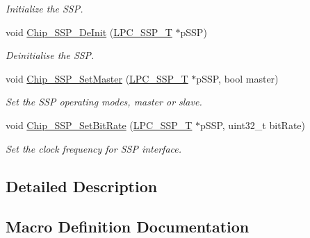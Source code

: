 \begin{DoxyCompactItemize}
\begin{DoxyCompactList}\small\item\em Initialize the S\+SP. \end{DoxyCompactList}\item 
void \hyperlink{group___s_s_p__18_x_x__43_x_x_ga48f87506f2fddc1043606eae292b6f16}{Chip\+\_\+\+S\+S\+P\+\_\+\+De\+Init} (\hyperlink{struct_l_p_c___s_s_p___t}{L\+P\+C\+\_\+\+S\+S\+P\+\_\+T} $\ast$p\+S\+SP)
\begin{DoxyCompactList}\small\item\em Deinitialise the S\+SP. \end{DoxyCompactList}\item 
void \hyperlink{group___s_s_p__18_x_x__43_x_x_ga60e601329b0aa6afe5f355dc6e8f84bd}{Chip\+\_\+\+S\+S\+P\+\_\+\+Set\+Master} (\hyperlink{struct_l_p_c___s_s_p___t}{L\+P\+C\+\_\+\+S\+S\+P\+\_\+T} $\ast$p\+S\+SP, bool master)
\begin{DoxyCompactList}\small\item\em Set the S\+SP operating modes, master or slave. \end{DoxyCompactList}\item 
void \hyperlink{group___s_s_p__18_x_x__43_x_x_ga373660d8ad7b28fb71209539b1e72717}{Chip\+\_\+\+S\+S\+P\+\_\+\+Set\+Bit\+Rate} (\hyperlink{struct_l_p_c___s_s_p___t}{L\+P\+C\+\_\+\+S\+S\+P\+\_\+T} $\ast$p\+S\+SP, uint32\+\_\+t bit\+Rate)
\begin{DoxyCompactList}\small\item\em Set the clock frequency for S\+SP interface. \end{DoxyCompactList}\end{DoxyCompactItemize}


\subsection{Detailed Description}


\subsection{Macro Definition Documentation}
\mbox{\label{group___s_s_p__18_x_x__43_x_x_ga6333b5eaf9d5301431fc0399c0d417d5}} 
